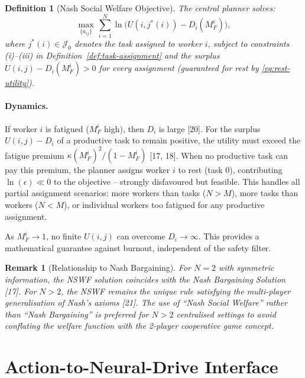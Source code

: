 \documentclass[11pt,a4paper]{article}
\newtheorem{definition}[theorem]{Definition}
\newtheorem{remark}[theorem]{Remark}
\begin{document}
\begin{definition}[Nash Social Welfare Objective]\label{def:nswf}
The central planner solves:
\begin{equation}\label{eq:nswf}
\max_{\{a_{ij}\}}\, \sum_{i=1}^{N} \ln\bigl(U(i, j^*(i)) - D_i(M_F^i)\bigr),
\end{equation}
where $j^*(i) \in \mathcal{J}_0$ denotes the task assigned to worker
$i$, subject to constraints (i)--(iii) in
Definition~\ref{def:task-assignment} and the surplus
$U(i, j) - D_i(M_F^i) > 0$ for every assignment (guaranteed for rest
by \eqref{eq:rest-utility}).
\end{definition}

\paragraph{Dynamics.} If worker $i$ is fatigued ($M_F^i$ high), then
$D_i$ is large [20]. For the surplus $U(i, j) - D_i$ of a productive
task to remain positive, the utility must exceed the fatigue premium
$\kappa(M_F^i)^2 / (1 - M_F^i)$ [17, 18]. When no productive task can
pay this premium, the planner assigns worker $i$ to rest (task 0),
contributing $\ln(\epsilon) \ll 0$ to the objective -- strongly
disfavoured but feasible. This handles all partial assignment
scenarios: more workers than tasks ($N > M$), more tasks than workers
($N < M$), or individual workers too fatigued for any productive
assignment.

As $M_F^i \to 1$, no finite $U(i, j)$ can overcome $D_i \to \infty$.
This provides a mathematical guarantee against burnout, independent
of the safety filter.

\begin{remark}[Relationship to Nash Bargaining]
For $N = 2$ with symmetric information, the NSWF solution coincides
with the Nash Bargaining Solution [17]. For $N > 2$, the NSWF remains
the unique rule satisfying the multi-player generalisation of Nash's
axioms [21]. The use of ``Nash Social Welfare'' rather than ``Nash
Bargaining'' is preferred for $N > 2$ centralised settings to avoid
conflating the welfare function with the 2-player cooperative game
concept.
\end{remark}

\section{Action-to-Neural-Drive Interface}
\end{document}
